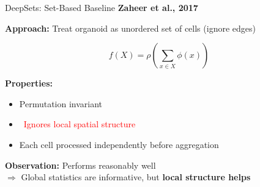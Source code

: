\documentclass[aspectratio=169]{beamer}
\begin{document}
\begin{frame}{DeepSets: Set-Based Baseline}
    \textbf{Zaheer et al., 2017}
    
    \vspace{0.5em}
    \textbf{Approach:} Treat organoid as unordered set of cells (ignore edges)
    
    \begin{equation*}
        f(X) = \rho\left(\sum_{x \in X} \phi(x)\right)
    \end{equation*}
    
    \vspace{0.5em}
    \textbf{Properties:}
    \begin{itemize}
        \item Permutation invariant
        \item \textcolor{red}{\faTimes\ Ignores local spatial structure}
        \item Each cell processed independently before aggregation
    \end{itemize}
    
    \vspace{0.5em}
    \textbf{Observation:} Performs reasonably well\\
    $\Rightarrow$ Global statistics are informative, but \textbf{local structure helps}
\end{frame}
\end{document}
